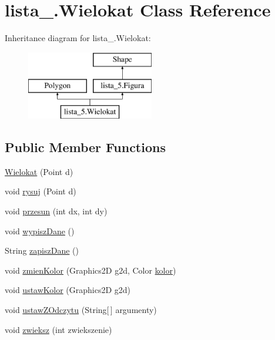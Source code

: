 \hypertarget{classlista__5_1_1_wielokat}{}\section{lista\+\_.\+Wielokat Class Reference}
\label{classlista__5_1_1_wielokat}
Inheritance diagram for lista\+\_.\+Wielokat\+:\begin{figure}[H]
\begin{center}
\leavevmode
\includegraphics[height=3.000000cm]{classlista__5_1_1_wielokat}
\end{center}
\end{figure}
\subsection*{Public Member Functions}
\begin{DoxyCompactItemize}
\item 
\mbox{\hyperlink{classlista__5_1_1_wielokat_a902f38459eb1935a604537d621f5ca6b}{Wielokat}} (Point d)
\item 
void \mbox{\hyperlink{classlista__5_1_1_wielokat_aca4b29bcec579f442ac566ec3be96d84}{rysuj}} (Point d)
\item 
void \mbox{\hyperlink{classlista__5_1_1_wielokat_a565dc0340d5329d74e5f1f7d0eed1049}{przesun}} (int dx, int dy)
\item 
void \mbox{\hyperlink{classlista__5_1_1_wielokat_ad1df79cd3736bb0fcf3ba2252409f3f8}{wypisz\+Dane}} ()
\item 
String \mbox{\hyperlink{classlista__5_1_1_wielokat_a6391ebe6bc42d42b6bd3041b1a6bd7bd}{zapisz\+Dane}} ()
\item 
void \mbox{\hyperlink{classlista__5_1_1_wielokat_ae863735ff7b742c4703bc142455d34ce}{zmien\+Kolor}} (Graphics2D g2d, Color \mbox{\hyperlink{classlista__5_1_1_wielokat_a6804efa88b78068f50c71ba760dcccc5}{kolor}})
\item 
void \mbox{\hyperlink{classlista__5_1_1_wielokat_a0c33c8213f6796d16aac592f2a961768}{ustaw\+Kolor}} (Graphics2D g2d)
\item 
void \mbox{\hyperlink{classlista__5_1_1_wielokat_a8427c86e5be650cbece5464eee1ac053}{ustaw\+Z\+Odczytu}} (String\mbox{[}$\,$\mbox{]} argumenty)
\item 
void \mbox{\hyperlink{classlista__5_1_1_wielokat_a17cfc98331e2a135886070a4094ac0e6}{zwieksz}} (int zwiekszenie)
\end{DoxyCompactItemize}
